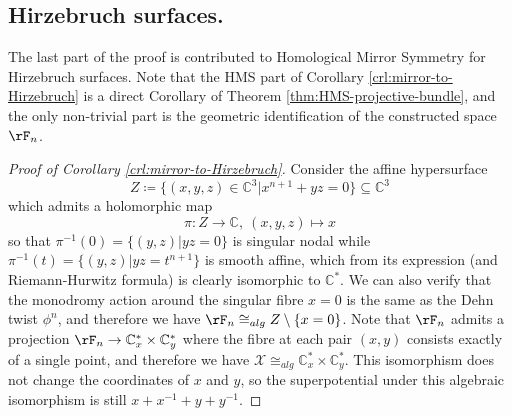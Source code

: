 \subsection{Hirzebruch surfaces.} The last part of the proof is contributed to Homological Mirror Symmetry for Hirzebruch surfaces. Note that the HMS part of Corollary \ref{crl:mirror-to-Hirzebruch} is a direct Corollary of Theorem \ref{thm:HMS-projective-bundle}, and the only non-trivial part is the geometric identification of the constructed space $\rF_n$.
\begin{proof}[Proof of Corollary \ref{crl:mirror-to-Hirzebruch}]
     Consider the affine hypersurface \[
            Z\coloneqq\{(x,y,z)\in\mathbb{C}^3\vert x^{n+1}+yz=0\}\subseteq\mathbb{C}^3
        \]which admits a holomorphic map \[
            \pi\colon Z\to\mathbb{C},\ (x,y,z)\mapsto x
        \]so that $\pi^{-1} (0)=\{(y,z)\vert yz=0\}$ is singular nodal while $\pi^{-1} (t)=\{(y,z)\vert yz =t^{n+1}\}$ is smooth affine, which from its expression (and Riemann-Hurwitz formula) is clearly isomorphic to $\mathbb{C}^{\ast}$. We can also verify that the monodromy action around the singular fibre $x=0$ is the same as the Dehn twist $\phi^n$, and therefore we have $\rF_n\cong_{alg} Z\setminus\{x=0\}$. Note that $\rF_n$ admits a projection $\rF_n\to\mathbb{C}_x^{\ast}\times\mathbb{C}_y^{\ast}$ where the fibre at each pair $(x,y)$ consists exactly of a single point, and therefore we have $\mathcal{X}\cong_{alg}\mathbb{C}_x^{\ast}\times\mathbb{C}_y^{\ast}$. This isomorphism does not change the coordinates of $x$ and $y$, so the superpotential under this algebraic isomorphism is still $x+x^{-1} +y+y^{-1}$.
\end{proof}
